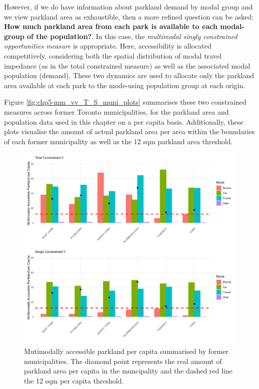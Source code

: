 \documentclass[
11pt, %
oneside, %
english, %
singlespacing, %
]{macthesis} %
\begin{document}
However, if we do have information about parkland demand by modal group and we view parkland area as exhaustible, then a more refined question can be asked: \textbf{How much parkland area from each park is available to each modal-group of the population?}. In this case, the \emph{multimodal singly constrained opportunities measure} is appropriate. Here, accessibility is allocated competitively, considering both the spatial distribution of modal travel impedance (as in the total constrained measure) as well as the associated modal population (demand). These two dynamics are used to allocate only the parkland area available at each park to the mode-using population group at each origin.

Figure \ref{fig:chp5-mm_vv_T_S_muni_plots} summarises these two constrained measures across former Toronto municipalities, for the parkland area and population data used in this chapter on a per capita basis. Additionally, these plots visualise the amount of actual parkland area per area within the boundaries of each former municipality as well as the 12 sqm parkland area threshold.

\begin{figure}

{\centering \includegraphics[width=6in]{./data/figures/chp5-mm_vv_T_S_muni_plots} 

}

\caption{\label{fig:chp5-mm_vv_T_S_muni_plots} Mutimodally accessible parkland per capita summarised by former municipalities. The diamond point represents the real amount of parkland area per capita in the muncipality and the dashed red line the 12 sqm per capita threshold.}\label{fig:unnamed-chunk-89}
\end{figure}
\end{document}
